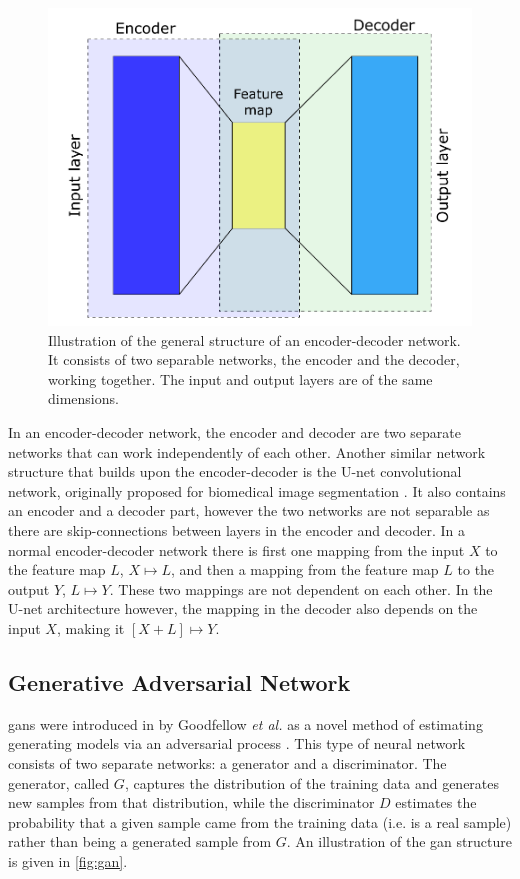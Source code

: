 \begin{figure}[htbp]  
    \centering
    \includegraphics[width=.7\textwidth]{figures/encoderdecoder.pdf}
    \caption[Illustration of an encoder-decoder network]{Illustration of the general structure of an encoder-decoder network. It consists of two separable networks, the encoder and the decoder, working together. The input and output layers are of the same dimensions. }
    \label{fig:encoderdecoder}
\end{figure}

In an encoder-decoder network, the encoder and decoder are two separate networks that can work independently of each other. Another similar network structure that builds upon the encoder-decoder is the U-net convolutional network, originally proposed for biomedical image segmentation \cite{unet}. It also contains an encoder and a decoder part, however the two networks are not separable as there are skip-connections between layers in the encoder and decoder. In a normal encoder-decoder network there is first one mapping from the input $X$ to the feature map $L$, $X \mapsto L$, and then a mapping from the feature map $L$ to the output $Y$, $L \mapsto Y$. These two mappings are not dependent on each other. In the U-net architecture however,  the mapping in the decoder also depends on the input $X$, making it $[X+L] \mapsto Y$. 


\subsection{Generative Adversarial Network}
\label{sec:ml:types:gan}
\gls{gan}s were introduced in \citeyear{goodfellow2014gan} by Goodfellow \textit{et al.} as a novel method of estimating generating models via an adversarial process \cite{goodfellow2014gan}. This type of neural network consists of two separate networks: a generator and a discriminator. The generator, called $G$, captures the distribution of the training data and generates new samples from that distribution, while the discriminator $D$ estimates the probability that a given sample came from the training data (i.e. is a real sample) rather than being a generated sample from $G$. An illustration of the \gls{gan} structure is given in \cref{fig:gan}. 

